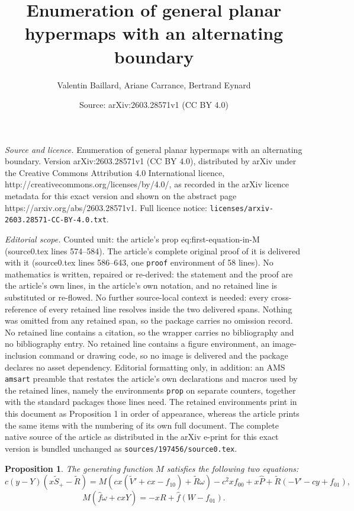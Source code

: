 \documentclass[10pt,a4paper]{amsart}
\title{Enumeration of general planar hypermaps with an alternating boundary}
\author{Valentin Baillard, Ariane Carrance, Bertrand Eynard}
\date{Source: arXiv:2603.28571v1 (CC BY 4.0)}
\newtheorem{prop}{Proposition}
\begin{document}
\maketitle

\noindent\emph{Source and licence.} Enumeration of general planar hypermaps with an alternating boundary. Version arXiv:2603.28571v1 (CC BY 4.0), distributed by arXiv under the Creative Commons Attribution 4.0 International licence, http://creativecommons.org/licenses/by/4.0/, as recorded in the arXiv licence metadata for this exact version and shown on the abstract page https://arxiv.org/abs/2603.28571v1. Full licence notice: \texttt{licenses/arxiv-2603.28571-CC-BY-4.0.txt}.\par\smallskip

\noindent\textit{Editorial scope.} Counted unit: the article's prop eq:first-equation-in-M (source0.tex lines 574--584). The article's complete original proof of it is delivered with it (source0.tex lines 586--643, one \texttt{proof} environment of 58 lines). No mathematics is written, repaired or re-derived: the statement and the proof are the article's own lines, in the article's own notation, and no retained line is substituted or re-flowed.  No further source-local context is needed: every cross-reference of every retained line resolves inside the two delivered spans.  Nothing was omitted from any retained span, so the package carries no omission record.  No retained line contains a citation, so the wrapper carries no bibliography and no bibliography entry.  No retained line contains a figure environment, an image-inclusion command or drawing code, so no image is delivered and the package declares no asset dependency.  Editorial formatting only, in addition: an AMS \texttt{amsart} preamble that restates the article's own declarations and macros used by the retained lines, namely the environments \texttt{prop} on separate counters, together with the standard packages those lines need.  The retained environments print in this document as Proposition 1 in order of appearance, whereas the article prints the same items with the numbering of its own full document.  The complete native source of the article as distributed in the arXiv e-print for this exact version is bundled unchanged as \texttt{sources/197456/source0.tex}.
\begin{prop}
The generating function $M$ satisfies the following two equations:
\begin{equation}
    c(y - Y)(x\widetilde{S}_+ - \widetilde{R}) = M\left(cx(\widetilde{V}'+cx-f_{10})+\widetilde{R}\omega\right) - c^2xf_{00} + x\widehat{P} + \widetilde{R}(-V'-cy+f_{01}),
\label{eq:first-equation-in-M}
\end{equation}
\begin{equation}
    M(\widehat{f}\omega + cxY) = -xR + \widehat{f}(W-f_{01}).
    \label{eq:second-equation-in-M}
\end{equation}
\end{prop}
\end{document}
